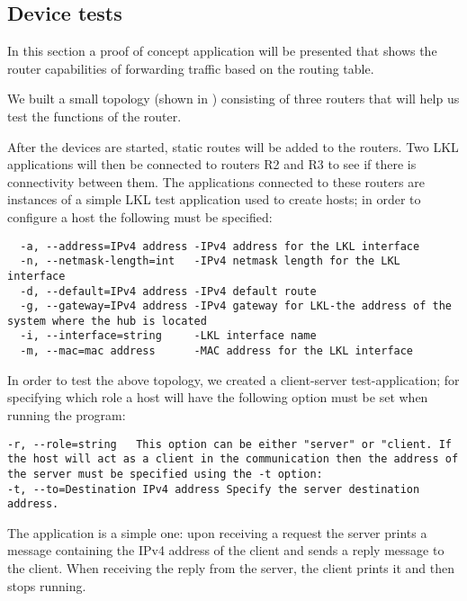 {{\subsection{Device tests}
\label{sub-sec:router-tests}

In this section a proof of concept application will be presented that shows the router capabilities of 
forwarding traffic based on the routing table. 

We built a small topology (shown in ) consisting of three routers that will help us test the functions of the router.

After the devices are started, static routes will be added to the routers. Two LKL applications will 
then be connected to routers R2 and R3 to see if there is connectivity between them. The applications 
connected to these routers are instances of a simple LKL test application used to create hosts; in order 
to configure a host the following must be specified:

\begin{lstlisting}
  -a, --address=IPv4 address -IPv4 address for the LKL interface
  -n, --netmask-length=int   -IPv4 netmask length for the LKL interface
  -d, --default=IPv4 address -IPv4 default route
  -g, --gateway=IPv4 address -IPv4 gateway for LKL-the address of the system where the hub is located
  -i, --interface=string     -LKL interface name
  -m, --mac=mac address      -MAC address for the LKL interface
\end{lstlisting}

\begin{comment}
  -l, --lkl                  -means that this application uses LKL
  -p, --port=int             Port
  -r, --role=string          server/client
  -t, --to=Destination IPv4 address
                             IPv4 destination
\end{comment}
In order to test the above topology, we created a client-server test-application; for specifying which role a host will have the following option must be set when running the program:
\begin{lstlisting}
-r, --role=string   This option can be either "server" or "client. If the host will act as a client in the communication then the address of the server must be specified using the -t option:
-t, --to=Destination IPv4 address Specify the server destination address.
\end{lstlisting} 
The application is a simple one: upon receiving a request the server prints a message containing the 
IPv4 address of the client and sends a reply message to the client. When receiving the reply from the server, the client prints it and then stops running.

}}
